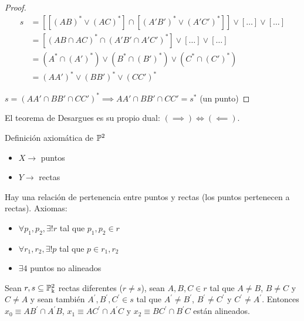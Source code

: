 \begin{proof}
\begin{align*}
    s &= \left[ \left[ \left(AB\right)^* \vee \left(AC\right)^* \right] \cap \left[ \left(A'B'\right)^* \vee \left(A'C'\right)^* \right] \right]
    \vee [\dots ] \vee [\dots] \\
    &= \left[ (AB \cap AC)^* \cap \left(A'B' \cap A'C' \right)^* \right] \vee [\dots] \vee [\dots] \\
    &= \left(A^* \cap (A')^* \right) \vee \left(B^* \cap (B')^* \right) \vee \left(C^* \cap (C')^* \right) \\
    &= (AA')^* \vee (BB')^* \vee (CC')^*
\end{align*}

$s = (AA' \cap BB' \cap CC')^* \implies AA' \cap BB' \cap CC' = s^*$ (un punto)
\end{proof}
\begin{obs}
El teorema de Desargues es su propio dual: $(\implies) \iff (\impliedby)$.
\end{obs}
\begin{obs}
Definición axiomática de $\mathbb{P}^2$
\begin{itemize}
    \item $X \rightarrow$ puntos
    \item $Y \rightarrow$ rectas
\end{itemize}
Hay una relación de pertenencia entre puntos y rectas (los puntos pertenecen a rectas). Axiomas:
\begin{itemize}
    \item $\forall p_1, p_2, \exists! r$ tal que $p_1, p_2 \in r$
    \item $\forall r_1, r_2, \exists! p$ tal que $p \in r_1, r_2$
    \item $\exists 4$ puntos no alineados
\end{itemize}
\end{obs}

\begin{teo}[de Pappus]
Sean $r,s \subseteq \mathbb{P}^2_\Bbbk$ rectas diferentes ($r \neq s$), sean
$A,B,C \in r$ tal que $A \neq B$, $B \neq C$ y $C\neq A$ y sean también
$A^\prime,B^\prime,C^\prime \in s$ tal que $A^\prime \neq B^\prime$,
$B^\prime \neq C^\prime$ y $C^\prime \neq A^\prime$. Entonces
$x_0 \equiv AB^\prime \cap A^\prime B$, $x_1 \equiv AC^\prime \cap A^\prime C$
y $x_2 \equiv BC^\prime \cap B^\prime C$ están alineados.
\end{teo}

